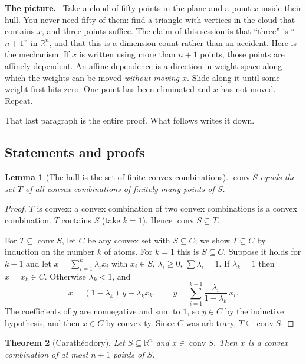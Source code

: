 \documentclass[11pt,a4paper]{article}
\newcommand{\mpart}[1]{\smallskip\noindent\textbf{#1}\ \ignorespaces}
\theoremstyle{definition}
\theoremstyle{plain}
\newtheorem{theorem}{Theorem}
\newtheorem{lemma}[theorem]{Lemma}
\theoremstyle{remark}
\newcommand{\R}{\mathbb{R}}
\DeclareMathOperator{\conv}{conv}
\begin{document}
\mpart{The picture.} Take a cloud of fifty points in the plane and a point $x$ inside their
hull. You never need fifty of them: find a triangle with vertices in the cloud that contains
$x$, and three points suffice. The claim of this session is that ``three'' is ``$n+1$'' in
$\R^n$, and that this is a dimension count rather than an accident. Here is the mechanism. If
$x$ is written using more than $n+1$ points, those points are affinely dependent. An affine
dependence is a direction in weight-space along which the weights can be moved \emph{without
moving $x$}. Slide along it until some weight first hits zero. One point has been eliminated
and $x$ has not moved. Repeat.

That last paragraph is the entire proof. What follows writes it down.

\subsection*{Statements and proofs}

\begin{lemma}[The hull is the set of finite convex combinations]
\label{lem:hull}
$\conv S$ equals the set $T$ of all convex combinations of finitely many points of $S$.
\end{lemma}

\begin{proof}
$T$ is convex: a convex combination of two convex combinations is a convex combination. $T$
contains $S$ (take $k=1$). Hence $\conv S\subseteq T$.

For $T\subseteq\conv S$, let $C$ be any convex set with $S\subseteq C$; we show $T\subseteq C$
by induction on the number $k$ of atoms. For $k=1$ this is $S\subseteq C$. Suppose it holds for
$k-1$ and let $x=\sum_{i=1}^k\lambda_ix_i$ with $x_i\in S$, $\lambda_i\ge0$, $\sum\lambda_i=1$.
If $\lambda_k=1$ then $x=x_k\in C$. Otherwise $\lambda_k<1$, and
\[
x=(1-\lambda_k)\,y+\lambda_kx_k,\qquad
y=\sum_{i=1}^{k-1}\frac{\lambda_i}{1-\lambda_k}\,x_i .
\]
The coefficients of $y$ are nonnegative and sum to $1$, so $y\in C$ by the inductive hypothesis,
and then $x\in C$ by convexity. Since $C$ was arbitrary, $T\subseteq\conv S$.
\end{proof}

\begin{theorem}[Carath\'eodory]
\label{thm:cara}
Let $S\subseteq\R^n$ and $x\in\conv S$. Then $x$ is a convex combination of at most $n+1$
points of $S$.
\end{theorem}
\end{document}
